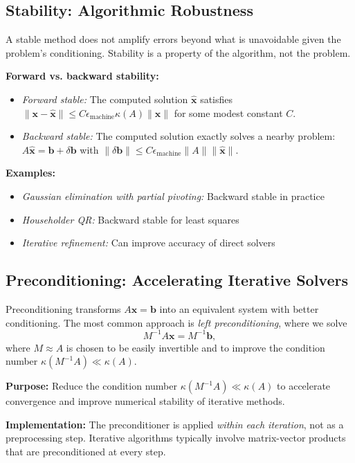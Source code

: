 \subsection[Stability]{Stability: Algorithmic Robustness}
A stable method does not amplify errors beyond what is unavoidable given the problem's conditioning. Stability is a property of the algorithm, not the problem.

\textbf{Forward vs. backward stability:}
\begin{itemize}[nosep]
    \item \emph{Forward stable:} The computed solution $\hat{\mathbf{x}}$ satisfies $\|\mathbf{x} - \hat{\mathbf{x}}\| \leq C \epsilon_{\text{machine}} \kappa(A) \|\mathbf{x}\|$ for some modest constant $C$.
    \item \emph{Backward stable:} The computed solution exactly solves a nearby problem: $A\hat{\mathbf{x}} = \mathbf{b} + \delta\mathbf{b}$ with $\|\delta\mathbf{b}\| \leq C \epsilon_{\text{machine}} \|A\| \|\hat{\mathbf{x}}\|$.
\end{itemize}

\textbf{Examples:}
\begin{itemize}[nosep]
    \item \emph{Gaussian elimination with partial pivoting:} Backward stable in practice
    \item \emph{Householder QR:} Backward stable for least squares
    \item \emph{Iterative refinement:} Can improve accuracy of direct solvers
\end{itemize}

\subsection[Preconditioning]{Preconditioning: Accelerating Iterative Solvers}
Preconditioning transforms $A\mathbf{x}=\mathbf{b}$ into an equivalent system with better conditioning. The most common approach is \emph{left preconditioning}, where we solve
\begin{equation}
    M^{-1}A\mathbf{x} = M^{-1}\mathbf{b},
\end{equation}
where $M \approx A$ is chosen to be easily invertible and to improve the condition number $\kappa(M^{-1}A) \ll \kappa(A)$.

\textbf{Purpose:} Reduce the condition number $\kappa(M^{-1}A) \ll \kappa(A)$ to accelerate convergence and improve numerical stability of iterative methods.

\textbf{Implementation:} The preconditioner is applied \emph{within each iteration}, not as a preprocessing step. Iterative algorithms typically involve matrix-vector products that are preconditioned at every step.

